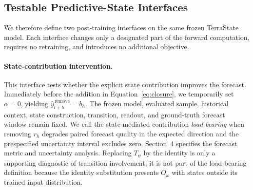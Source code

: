\documentclass[letterpaper]{article} %
\begin{document}
\subsection{Testable Predictive-State Interfaces}

We therefore define two post-training interfaces on the same frozen
TerraState model. Each interface changes only a designated part of the forward
computation, requires no retraining, and introduces no additional objective.

\paragraph{State-contribution intervention.}
This interface tests whether the explicit state contribution improves the
forecast. Immediately before the addition in Equation~\ref{eq:closure}, we
temporarily set $\alpha=0$, yielding
$\widehat y_{t+h}^{\,\mathrm{remove}}=b_h$. The frozen model, evaluated sample,
historical context, state construction, transition, readout, and ground-truth
forecast window remain fixed. We call the state-mediated contribution
\emph{load-bearing} when removing $r_h$ degrades paired forecast quality in
the expected direction and the prespecified uncertainty interval excludes
zero. Section~4 specifies the forecast metric and uncertainty analysis.
Replacing $T_\psi$ by the identity is only a supporting diagnostic of
transition involvement; it is not part of the load-bearing definition because
the identity substitution presents $O_\omega$ with states outside its trained
input distribution.
\end{document}
